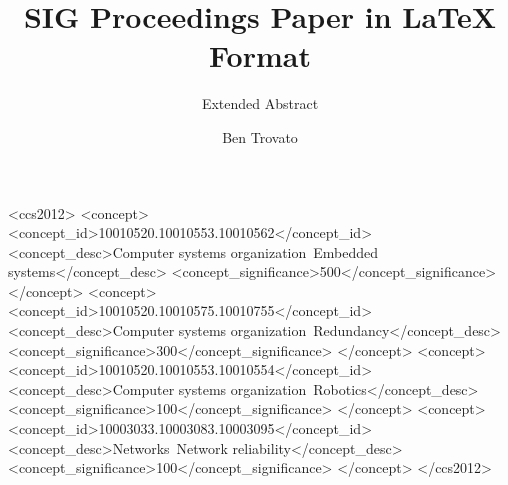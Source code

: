 \documentclass[sigplan, anonymous, review]{acmart}
\begin{document}
\title{SIG Proceedings Paper in LaTeX Format}
\subtitle{Extended Abstract}

\author{Ben Trovato}

\renewcommand{\shortauthors}{B. Trovato et al.}




%
%
\begin{CCSXML}
<ccs2012>
 <concept>
  <concept_id>10010520.10010553.10010562</concept_id>
  <concept_desc>Computer systems organization~Embedded systems</concept_desc>
  <concept_significance>500</concept_significance>
 </concept>
 <concept>
  <concept_id>10010520.10010575.10010755</concept_id>
  <concept_desc>Computer systems organization~Redundancy</concept_desc>
  <concept_significance>300</concept_significance>
 </concept>
 <concept>
  <concept_id>10010520.10010553.10010554</concept_id>
  <concept_desc>Computer systems organization~Robotics</concept_desc>
  <concept_significance>100</concept_significance>
 </concept>
 <concept>
  <concept_id>10003033.10003083.10003095</concept_id>
  <concept_desc>Networks~Network reliability</concept_desc>
  <concept_significance>100</concept_significance>
 </concept>
</ccs2012>
\end{CCSXML}





\maketitle
\end{document}
